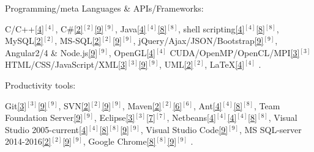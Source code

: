 \begin{cventries}

  \cventry
    {Programming/meta Languages \& APIs/Frameworks:} %
    {} %
    {} %
    {} %
    {     
      \begin{cvitems} %
        \item {
        C/C++\ref{4}{$^{[4]}$}, 
        C\#\ref{2}{$^{[2]}$}\ref{9}{$^{[9]}$}, 
        Java\ref{4}{$^{[4]}$}\ref{8}{$^{[8]}$}, 
        shell scripting\ref{4}{$^{[4]}$}\ref{8}{$^{[8]}$}, 
        MySQL\ref{2}{$^{[2]}$}, 
        MS-SQL\ref{2}{$^{[2]}$}\ref{9}{$^{[9]}$}, 
        jQuery/Ajax/JSON/Bootstrap\ref{9}{$^{[9]}$},  
        Angular2/4 \& Node.js\ref{9}{$^{[9]}$},  
		OpenGL\ref{4}{$^{[4]}$}       
        CUDA/OpenMP/OpenCL/MPI\ref{3}{$^{[3]}$}
        HTML/CSS/JavaScript/XML\ref{3}{$^{[3]}$}\ref{9}{$^{[9]}$}, 
        UML\ref{2}{$^{[2]}$},
        LaTeX\ref{4}{$^{[4]}$}%
		.}
	  \end{cvitems}
    }  
  \vspace{-0.4cm}

  \cventry
    {Productivity tools:} %
    {} %
    {} %
    {} %
    {
      \begin{cvitems} %
        \item {
        Git\ref{3}{$^{[3]}$}\ref{9}{$^{[9]}$}, 
        SVN\ref{2}{$^{[2]}$}\ref{9}{$^{[9]}$}, 
        Maven\ref{2}{$^{[2]}$}\ref{6}{$^{[6]}$}, 
        Ant\ref{4}{$^{[4]}$}\ref{8}{$^{[8]}$}, 
        Team Foundation Server\ref{9}{$^{[9]}$}, 
        Eclipse\ref{3}{$^{[3]}$}\ref{7}{$^{[7]}$}, 
        Netbeans\ref{4}{$^{[4]}$}\ref{4}{$^{[4]}$}\ref{8}{$^{[8]}$}, 
        Visual Studio 2005-current\ref{4}{$^{[4]}$}\ref{8}{$^{[8]}$}\ref{9}{$^{[9]}$},
        Visual Studio Code\ref{9}{$^{[9]}$}, 
        MS SQL-server 2014-2016\ref{2}{$^{[2]}$}\ref{9}{$^{[9]}$},
        Google Chrome\ref{8}{$^{[8]}$}\ref{9}{$^{[9]}$}%
        .}       
      \end{cvitems}
    }  
  \vspace{-0.4cm}  
    

\end{cventries}
